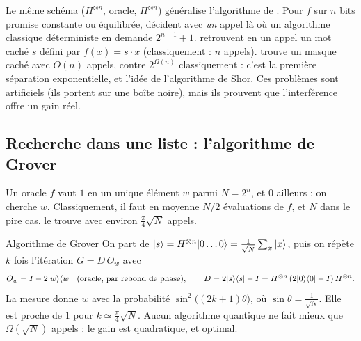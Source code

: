\begin{remarque}
Le même schéma ($H^{\otimes n}$, oracle, $H^{\otimes n}$) généralise l'algorithme de \textcite{deutsch1985}. Pour $f$ sur $n$ bits promise
constante ou équilibrée, \textcite{deutschjozsa1992} décident avec \emph{un} appel là où un algorithme classique
déterministe en demande $2^{n-1}+1$. \textcite{bernstein1997} retrouvent en un appel un mot caché
$s$ défini par $f(x)=s\cdot x$ (classiquement : $n$ appels). \textcite{simon1997} trouve un masque caché avec $O(n)$
appels, contre $2^{\Omega(n)}$ classiquement : c'est la première séparation exponentielle, et l'idée
de l'algorithme de Shor. Ces problèmes sont artificiels (ils portent sur une boîte noire), mais
ils prouvent que l'interférence offre un gain réel.
\end{remarque}

\subsection{Recherche dans une liste : l'algorithme de Grover}\label{sec:grover}

Un oracle $f$ vaut $1$ en un unique élément $w$ parmi $N=2^n$, et $0$ ailleurs ; on cherche $w$.
Classiquement, il faut en moyenne $N/2$ évaluations de $f$, et $N$ dans le pire cas. \textcite{grover1996}
le trouve avec environ $\frac\pi4\sqrt N$ appels.

\begin{resultat}{Algorithme de Grover}
On part de $|s\rangle=H^{\otimes n}|0\ldots0\rangle=\frac{1}{\sqrt N}\sum_x|x\rangle$, puis on répète $k$
fois l'itération $G=D\,O_w$ avec
\[
  O_w=I-2\ket{w}\bra{w}\ \ (\text{oracle, par rebond de phase}),\qquad
  D=2\ket{s}\bra{s}-I=H^{\otimes n}\,(2\ket{0}\bra{0}-I)\,H^{\otimes n}.
\]
La mesure donne $w$ avec la probabilité $\sin^2\!\big((2k+1)\theta\big)$, où $\sin\theta=\frac{1}{\sqrt N}$.
Elle est proche de $1$ pour $k\simeq\frac\pi4\sqrt N$. Aucun algorithme quantique ne fait mieux que
$\Omega(\sqrt N)$ appels : le gain est quadratique, et optimal.
\end{resultat}

